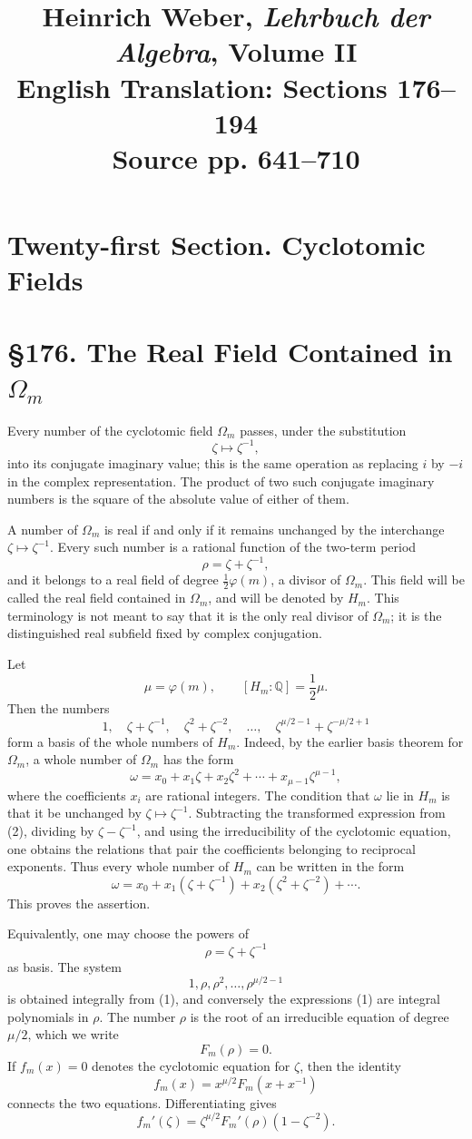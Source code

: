 \documentclass[12pt,a4paper]{article}
\title{Heinrich Weber, \emph{Lehrbuch der Algebra}, Volume II\\English Translation: Sections 176--194\\Source pp. 641--710}
\author{}
\date{}
\newcommand{\webersection}[2]{\clearpage\section*{\S #1. #2}}
\newcommand{\booktitle}[1]{\clearpage\section*{#1}}
\newcommand{\Om}{\Omega_m}
\newcommand{\Hm}{H_m}
\newcommand{\zetaS}{\zeta}
\begin{document}
\maketitle

\booktitle{Twenty-first Section. Cyclotomic Fields}

\webersection{176}{The Real Field Contained in \(\Om\)}

Every number of the cyclotomic field \(\Om\) passes, under the substitution
\[
  \zetaS\longmapsto \zetaS^{-1},
\]
into its conjugate imaginary value; this is the same operation as replacing \(i\) by \(-i\) in the complex representation.  The product of two such conjugate imaginary numbers is the square of the absolute value of either of them.

A number of \(\Om\) is real if and only if it remains unchanged by the interchange \(\zetaS\mapsto \zetaS^{-1}\).  Every such number is a rational function of the two-term period
\[
  \rho=\zetaS+\zetaS^{-1},
\]
and it belongs to a real field of degree \(\frac12\varphi(m)\), a divisor of \(\Om\).  This field will be called the real field contained in \(\Om\), and will be denoted by \(\Hm\).  This terminology is not meant to say that it is the only real divisor of \(\Om\); it is the distinguished real subfield fixed by complex conjugation.

Let
\[
  \mu=\varphi(m),\qquad [\Hm:\mathbb Q]=\frac12\mu.
\]
Then the numbers
\[
  1,
  \quad \zetaS+\zetaS^{-1},
  \quad \zetaS^2+\zetaS^{-2},
  \quad \ldots,
  \quad \zetaS^{\mu/2-1}+\zetaS^{-\mu/2+1}
\tag{1}
\]
form a basis of the whole numbers of \(\Hm\).  Indeed, by the earlier basis theorem for \(\Om\), a whole number of \(\Om\) has the form
\[
  \omega=x_0+x_1\zetaS+x_2\zetaS^2+\cdots+x_{\mu-1}\zetaS^{\mu-1},
\tag{2}
\]
where the coefficients \(x_i\) are rational integers.  The condition that \(\omega\) lie in \(\Hm\) is that it be unchanged by \(\zetaS\mapsto\zetaS^{-1}\).  Subtracting the transformed expression from (2), dividing by \(\zetaS-\zetaS^{-1}\), and using the irreducibility of the cyclotomic equation, one obtains the relations that pair the coefficients belonging to reciprocal exponents.  Thus every whole number of \(\Hm\) can be written in the form
\[
  \omega=x_0+x_1(\zetaS+\zetaS^{-1})+x_2(\zetaS^2+\zetaS^{-2})+\cdots.
\tag{3}
\]
This proves the assertion.

Equivalently, one may choose the powers of
\[
  \rho=\zetaS+\zetaS^{-1}
\]
as basis.  The system
\[
  1,\rho,\rho^2,\ldots,\rho^{\mu/2-1}
\tag{4}
\]
is obtained integrally from (1), and conversely the expressions (1) are integral polynomials in \(\rho\).  The number \(\rho\) is the root of an irreducible equation of degree \(\mu/2\), which we write
\[
  F_m(\rho)=0.
\]
If \(f_m(x)=0\) denotes the cyclotomic equation for \(\zetaS\), then the identity
\[
  f_m(x)=x^{\mu/2}F_m(x+x^{-1})
\tag{5}
\]
connects the two equations.  Differentiating gives
\[
  f_m'(\zetaS)=\zetaS^{\mu/2}F_m'(\rho)(1-\zetaS^{-2}).
\tag{6}
\]
\end{document}
